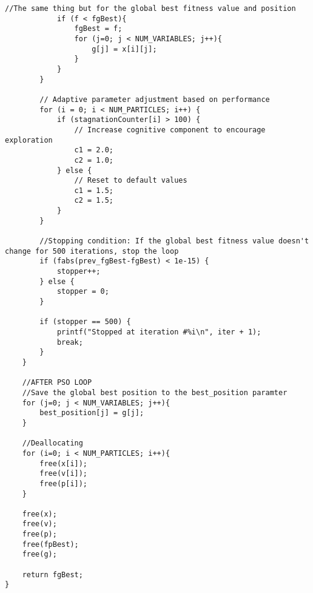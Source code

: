 \documentclass[12pt]{article}
\begin{document}
\begin{lstlisting}[basicstyle=\small]
            //The same thing but for the global best fitness value and position
            if (f < fgBest){
                fgBest = f;
                for (j=0; j < NUM_VARIABLES; j++){
                    g[j] = x[i][j];
                }
            }
        }

        // Adaptive parameter adjustment based on performance
        for (i = 0; i < NUM_PARTICLES; i++) {
            if (stagnationCounter[i] > 100) {
                // Increase cognitive component to encourage exploration
                c1 = 2.0;
                c2 = 1.0;
            } else {
                // Reset to default values
                c1 = 1.5;
                c2 = 1.5;
            }
        }

        //Stopping condition: If the global best fitness value doesn't change for 500 iterations, stop the loop
        if (fabs(prev_fgBest-fgBest) < 1e-15) {
            stopper++;
        } else {
            stopper = 0;
        }

        if (stopper == 500) {
            printf("Stopped at iteration #%i\n", iter + 1);
            break;
        }
    }

    //AFTER PSO LOOP
    //Save the global best position to the best_position paramter 
    for (j=0; j < NUM_VARIABLES; j++){
        best_position[j] = g[j];
    }

    //Deallocating
    for (i=0; i < NUM_PARTICLES; i++){
        free(x[i]);
        free(v[i]);
        free(p[i]);
    }

    free(x);
    free(v);
    free(p);
    free(fpBest);
    free(g);

    return fgBest;
}
	\end{lstlisting}
	
\end{document}
